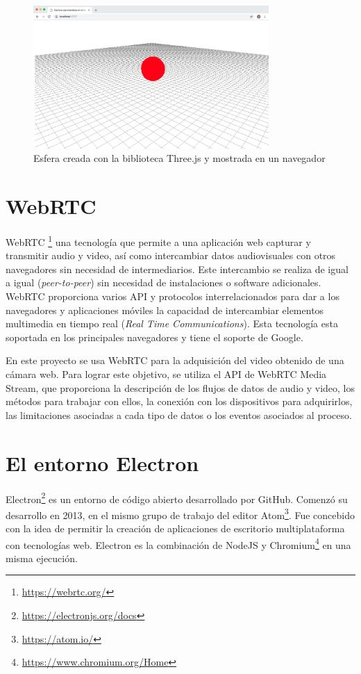 \begin{figure}[H]
  \begin{center}
    \includegraphics[width=0.8\textwidth]{figures/esferathreejs.png}
		\caption{Esfera creada con la biblioteca Three.js y mostrada en un navegador}
		\label{fig.esferathreejs}
		\end{center}
\end{figure}

\section{WebRTC}
WebRTC \footnote{\url{https://webrtc.org/}}  una tecnología que permite a una aplicación web capturar y transmitir audio y video, así como intercambiar datos audiovisuales con otros navegadores sin necesidad de intermediarios. Este intercambio se realiza de igual a igual (\textit{peer-to-peer}) sin necesidad de instalaciones o software adicionales. WebRTC proporciona varios API y protocolos interrelacionados para dar a los navegadores y aplicaciones móviles la capacidad de intercambiar elementos multimedia en tiempo real (\textit{Real Time Communications}). Esta tecnología esta soportada en los principales navegadores y tiene el soporte de Google.

En este proyecto se usa WebRTC para la adquisición del video obtenido de una cámara web. Para lograr este objetivo, se utiliza el API de WebRTC Media Stream, que proporciona la descripción de los flujos de datos de audio y video, los métodos para trabajar con ellos, la conexión con los dispositivos para adquirirlos, las limitaciones asociadas a cada tipo de datos o los eventos asociados al proceso.

\section{El entorno Electron}
Electron\footnote{\url{https://electronjs.org/docs}} es un entorno de código abierto desarrollado por GitHub. Comenzó su desarrollo en 2013, en el mismo grupo de trabajo del editor Atom\footnote{\url{https://atom.io/}}. Fue concebido con la idea de permitir la creación de aplicaciones de escritorio multiplataforma con tecnologías web. Electron es la combinación de NodeJS y Chromium\footnote{\url{https://www.chromium.org/Home}} en una misma ejecución.

